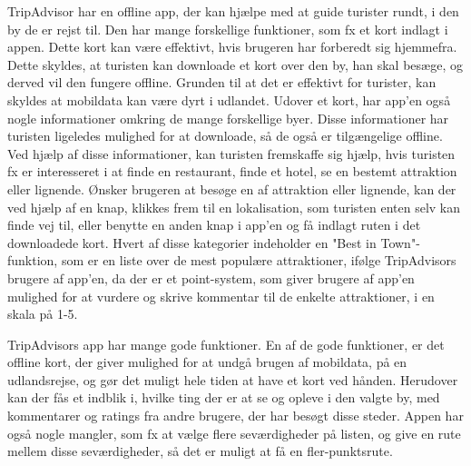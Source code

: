 TripAdvisor har en offline app, der kan hjælpe med at guide turister rundt, i den by de er rejst til. Den har mange forskellige funktioner, som fx et kort indlagt i appen. Dette kort kan være effektivt, hvis brugeren har forberedt sig hjemmefra. Dette skyldes, at turisten kan downloade et kort over den by, han skal besæge, og derved vil den fungere offline. Grunden til at det er effektivt for turister, kan skyldes at mobildata kan være dyrt i udlandet\citep {TDC}. \newline
Udover et kort, har app'en også nogle informationer omkring de mange forskellige byer. Disse informationer har turisten ligeledes mulighed for at downloade, så de også er tilgængelige offline. Ved hjælp af disse informationer, kan turisten fremskaffe sig hjælp, hvis turisten fx er interesseret i at finde en restaurant, finde et hotel, se en bestemt attraktion eller lignende. Ønsker brugeren at besøge en af attraktion eller lignende, kan der ved hjælp af en knap, klikkes frem til en lokalisation, som turisten enten selv kan finde vej til, eller benytte en anden knap i app'en og få indlagt ruten i det downloadede kort.\newline
Hvert af disse kategorier indeholder en "Best in Town"-funktion, som er en liste over de mest populære attraktioner, ifølge TripAdvisors brugere af app'en, da der er et point-system, som giver brugere af app'en mulighed for at vurdere og skrive kommentar til de enkelte attraktioner, i en skala på 1-5. \newline

TripAdvisors app har mange gode funktioner. En af de gode funktioner, er det offline kort, der giver mulighed for at undgå brugen af mobildata, på en udlandsrejse, og gør det muligt hele tiden at have et kort ved hånden. Herudover kan der fås et indblik i, hvilke ting der er at se og opleve i den valgte by, med kommentarer og ratings fra andre brugere, der har besøgt disse steder.
Appen har også nogle mangler, som fx at vælge flere seværdigheder på listen, og give en rute mellem disse seværdigheder, så det er muligt at få en fler-punktsrute. 